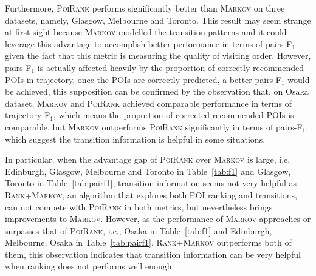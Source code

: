 Furthermore, \textsc{PoiRank} performs significantly better than \textsc{Markov} on three datasets, namely,
Glasgow, Melbourne and Toronto.
%
This result may seem strange at first sight because \textsc{Markov} modelled the transition patterns and it could leverage
this advantage to accomplish better performance in terms of pairs-F$_1$ given the fact that this metric is measuring the quality
of visiting order.
However, pairs-F$_1$ is actually affected heavily by the proportion of correctly recommended POIs in trajectory,
once the POIs are correctly predicted, a better pairs-F$_1$ would be achieved,
this supposition can be confirmed by the observation that, on Osaka dataset, \textsc{Markov} and \textsc{PoiRank} achieved
comparable performance in terms of trajectory F$_1$, which means the proportion of corrected recommended POIs is comparable,
but \textsc{Markov} outperforms \textsc{PoiRank} significantly in terms of pairs-F$_1$,
which suggest the transition information is helpful in some situations.

In particular, when the advantage gap of \textsc{PoiRank} over \textsc{Markov} is large,
i.e. Edinburgh, Glasgow, Melbourne and Toronto in Table~\ref{tab:f1} and Glasgow, Toronto in Table~\ref{tab:pairf1},
transition information seems not very helpful as \textsc{Rank+Markov}, an algorithm that explores both POI ranking and transitions,
can not compete with \textsc{PoiRank} in both metrics, but nevertheless brings improvements to \textsc{Markov}.
However, as the performance of \textsc{Markov} approaches or surpasses that of \textsc{PoiRank},
i.e., Osaka in Table~\ref{tab:f1} and Edinburgh, Melbourne, Osaka in Table~\ref{tab:pairf1},
\textsc{Rank+Markov} outperforms both of them, this observation indicates that transition information can be very helpful when
ranking does not performs well enough.

